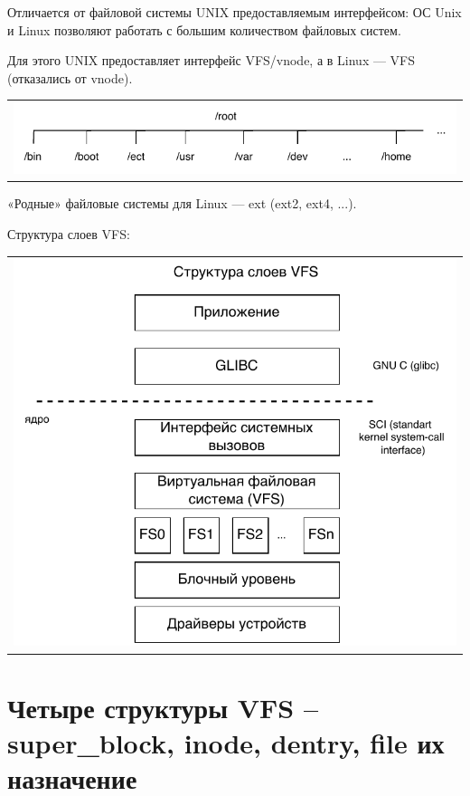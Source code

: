 Отличается от файловой системы UNIX предоставляемым интерфейсом: ОС Unix и Linux позволяют работать с большим количеством файловых систем.

Для этого UNIX предоставляет интерфейс VFS/vnode, а в Linux — VFS (отказались от vnode).

\begin{table}[h!]
  \centering
  \begin{tabular}{p{1\linewidth}}
    \centering
    \includegraphics[width=0.8\linewidth]{./images/root.pdf}
  \end{tabular}
\end{table}

«Родные» файловые системы для Linux — ext (ext2, ext4, ...).

Структура слоев VFS:

\begin{table}[h!]
  \centering
  \begin{tabular}{p{1\linewidth}}
    \centering
    \includegraphics[width=0.8\linewidth]{./images/VFS_struct.pdf}
  \end{tabular}
\end{table}

\section{Четыре структуры VFS – super\_block, inode, dentry, file их назначение}


